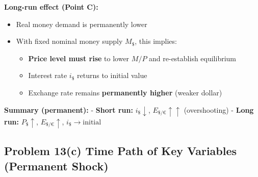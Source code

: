 \documentclass[
]{article}
\providecommand{\tightlist}{%
  \setlength{\itemsep}{0pt}\setlength{\parskip}{0pt}}
\begin{document}
\textbf{Long-run effect (Point C):}

\begin{itemize}
\tightlist
\item
  Real money demand is permanently lower
\item
  With fixed nominal money supply \(M_{\$}\), this implies:

  \begin{itemize}
  \tightlist
  \item
    \textbf{Price level must rise} to lower \(M/P\) and re-establish
    equilibrium
  \item
    Interest rate \(i_{\$}\) returns to initial value
  \item
    Exchange rate remains \textbf{permanently higher} (weaker dollar)
  \end{itemize}
\end{itemize}

\textbf{Summary (permanent):} - \textbf{Short run:}
\(i_{\$} \downarrow\), \(E_{\$/€} \uparrow \uparrow\) (overshooting) -
\textbf{Long run:} \(P_{\$} \uparrow\), \(E_{\$/€} \uparrow\),
\(i_{\$} \rightarrow \text{initial}\)

\subsection{Problem 13(c) Time Path of Key Variables (Permanent
Shock)}\label{problem-13c-time-path-of-key-variables-permanent-shock}
\end{document}
